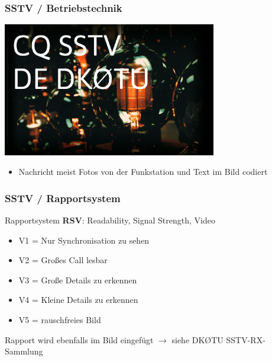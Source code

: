 \begin{frame}
    \frametitle{SSTV / Betriebstechnik}

    \begin{center}
        \includegraphics[width=0.7\textwidth,height=.7\textheight,keepaspectratio]{e16/Transmittingtubes.jpg}
    \end{center}


    \begin{itemize}
        \item Nachricht meist Fotos von der Funkstation und Text im Bild codiert
    \end{itemize}

\end{frame}

\begin{frame}
    \frametitle{SSTV / Rapportsystem}
   

    Rapportsystem \textbf{RSV}\hyperlink{refs}{\cite{bv12}}: Readability, Signal Strength, Video

    \begin{itemize}
        \item V1 = Nur Synchronisation zu sehen
        \item V2 = Großes Call lesbar
        \item V3 = Große Details zu erkennen
        \item V4 = Kleine Details zu erkennen
        \item V5 = rauschfreies Bild
    \end{itemize}

    Rapport wird ebenfalls im Bild eingefügt $\rightarrow$ siehe DKØTU
    SSTV-RX-Sammlung

\end{frame}

